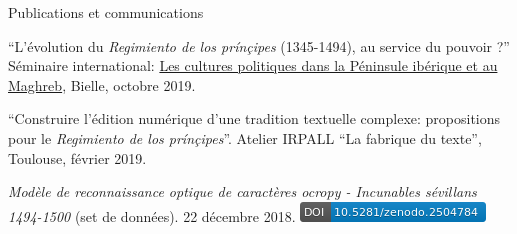 











\begin{rubric}{Publications et communications}
                    
                
                    
                    \entry*
                \enquote{L'évolution du \textit{Regimiento de los prínçipes}
                        (1345-1494), au service du pouvoir ?} Séminaire international: \href{https://recherche.univ-pau.fr/fr/accueil/cpim.html}{Les cultures
                        politiques dans la Péninsule ibérique et au Maghreb},
                        Bielle, octobre 2019. 
                    
                    \entry*
                \enquote{Construire l'édition numérique d'une tradition textuelle
                        complexe: propositions pour le \textit{Regimiento de los
                        prínçipes}}. Atelier IRPALL \enquote{La fabrique du texte},
                        Toulouse, février 2019.
            
                    
                    \entry*
                \textit{Modèle de reconnaissance optique de caractères ocropy -
                        Incunables sévillans 1494-1500} (set de données). 22 décembre 2018.
                        \href{https://doi.org/10.5281/zenodo.2504783}{\includegraphics[scale=0.55]{img/zenodo2504784.png}}\end{rubric}


